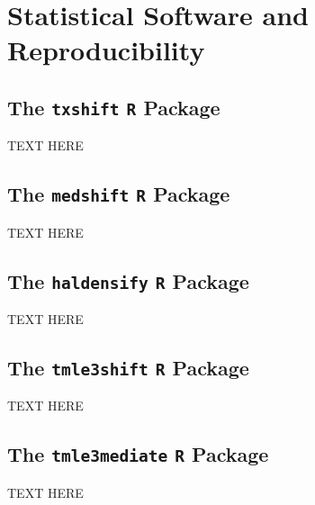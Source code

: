 \chapter{Statistical Software and Reproducibility}

\section{The \texttt{txshift} \texttt{R} Package}

TEXT HERE

\section{The \texttt{medshift} \texttt{R} Package}

TEXT HERE

\section{The \texttt{haldensify} \texttt{R} Package}

TEXT HERE

\section{The \texttt{tmle3shift} \texttt{R} Package}

TEXT HERE

\section{The \texttt{tmle3mediate} \texttt{R} Package}

TEXT HERE

